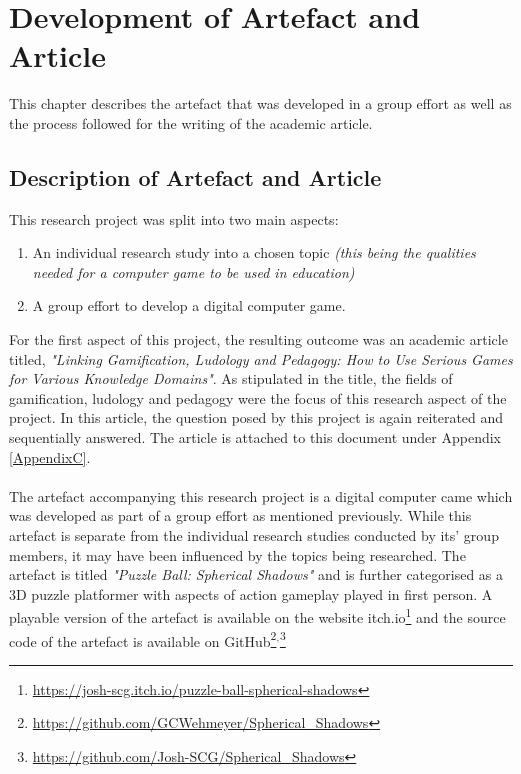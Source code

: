 
\chapter{Development of Artefact and Article} %

\label{Chapter3} %

This chapter describes the artefact that was developed in a group effort as well as the process followed for the writing of the academic article.

\section{Description of Artefact and Article}
This research project was split into two main aspects: 
\begin{enumerate}
\item An individual research study into a chosen topic \textit{(this being the qualities needed for a computer game to be used in education)}
\item A group effort to develop a digital computer game.
\end{enumerate}

\noindent For the first aspect of this project, the resulting outcome was an academic article titled, \textit{"Linking Gamification, Ludology and Pedagogy: How to Use Serious Games for Various Knowledge Domains"}. As stipulated in the title, the fields of gamification, ludology and pedagogy were the focus of this research aspect of the project. In this article, the question posed by this project is again reiterated and sequentially answered. The article is attached to this document under Appendix  \ref{AppendixC}. 
\\\\
The artefact accompanying this research project is a digital computer came which was developed as part of a group effort as mentioned previously. While this artefact is separate from the individual research studies conducted by its' group members, it may have been influenced by the topics being researched. The artefact is titled \textit{"Puzzle Ball: Spherical Shadows"} and is further categorised as a 3D puzzle platformer with aspects of action gameplay played in first person. A playable version of the artefact is available on the website itch.io\footnote{\url{https://josh-scg.itch.io/puzzle-ball-spherical-shadows}} and the source code of the artefact is available on GitHub\footnote{\url{https://github.com/GCWehmeyer/Spherical_Shadows}}$^{,}$\footnote{\url{https://github.com/Josh-SCG/Spherical_Shadows}}

